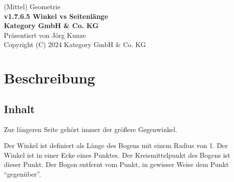 \documentclass[a4paper]{amsart}
\theoremstyle{definition}
\begin{document}
\begin{titlepage}
\centering
{\huge
(Mittel) Geometrie\\[1cm]
\textbf{v1.7.6.5 Winkel vs Seitenlänge}
}\\[1cm]

\textbf{Kategory GmbH \& Co. KG}\\
Präsentiert von Jörg Kunze\\
Copyright (C) 2024 Kategory GmbH \& Co. KG

\end{titlepage}

%

\newpage

\section*{Beschreibung}


\subsection*{Inhalt}
Zur längeren Seite gehört immer der größere Gegenwinkel.

Der Winkel ist definiert als Länge des Bogens mit einem Radius von 1. Der Winkel ist in einer Ecke eines Punktes. Der Kreismittelpunkt des Bogens ist dieser Punkt. Der Bogen entfernt vom Punkt, in gewisser Weise dem Punkt "`gegenüber"'.
\end{document}
